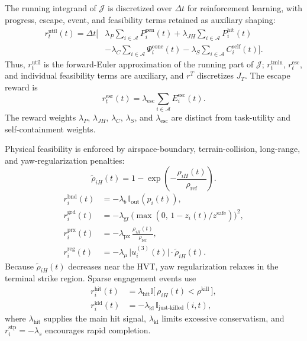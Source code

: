 \documentclass{cja}
\begin{document}
The running integrand of $\mathcal J$ is discretized over $\Delta t$ for reinforcement learning, with progress, escape, event, and feasibility terms retained as auxiliary shaping:
\begin{equation}
\begin{aligned}
r_t^{\mathrm{util}}(t)
=
\Delta t
\Biggl[
&
\lambda_P
\sum_{i\in\mathcal A}
P_i^{\mathrm{pen}}(t)
+
\lambda_{JH}
\sum_{i\in\mathcal A}
P_i^{\mathrm{hit}}(t)
\\
&-
\lambda_C
\sum_{i\in\mathcal A}
\Psi_i^{\mathrm{cone}}(t)
-
\lambda_S
\sum_{i\in\mathcal A}
C_i^{\mathrm{self}}(t)
\Biggr].
\end{aligned}
\label{eq:r-prior}
\end{equation}
Thus, $r_t^{\mathrm{util}}$ is the forward-Euler approximation of the running part of $\mathcal J$; $r_t^{\mathrm{tmin}}$, $r_t^{\mathrm{esc}}$, and individual feasibility terms are auxiliary, and $r^T$ discretizes $J_T$. The escape reward is
\begin{equation}
r_t^{\mathrm{esc}}(t)=\lambda_{\mathrm{esc}}\sum_{i\in\mathcal{A}}E_i^{\mathrm{esc}}(t).
\end{equation}
The reward weights $\lambda_P$, $\lambda_{JH}$, $\lambda_C$, $\lambda_S$, and $\lambda_{\mathrm{esc}}$ are distinct from task-utility and self-containment weights.

Physical feasibility is enforced by airspace-boundary, terrain-collision, long-range, and yaw-regularization penalties:
\begin{equation}
\widetilde\rho_{iH}(t)
=
1-
\exp\!\left(-\frac{\rho_{iH}(t)}{\rho_{\mathrm{ref}}}\right).
\end{equation}
\begin{align}
r_i^{\mathrm{bnd}}(t)&=-\lambda_b\,\mathbb{I}_{\mathrm{out}}(p_i(t)),
\label{eq:r-bnd}\\
r_i^{\mathrm{grd}}(t)&=-\lambda_{\mathrm{gr}}\,\bigl(\max(0,\,1-z_i(t)/z^{\mathrm{safe}})\bigr)^{2},
\label{eq:r-grd}\\
r_i^{\mathrm{prx}}(t)&=-\lambda_{\mathrm{px}}\,\frac{\rho_{iH}(t)}{\rho_{\mathrm{ref}}},
\label{eq:r-prx}\\
r_i^{\mathrm{reg}}(t)&=-\lambda_{\mu}\,\bigl|u_i^{(3)}(t)\bigr|\cdot \widetilde\rho_{iH}(t).
\label{eq:r-reg}
\end{align}
Because $\widetilde\rho_{iH}(t)$ decreases near the HVT, yaw regularization relaxes in the terminal strike region. Sparse engagement events use
\begin{equation}
\begin{aligned}
r_i^{\mathrm{hit}}(t)
&=\lambda_{\mathrm{hit}}\mathbb{I}\bigl[\,\rho_{iH}(t)<\rho^{\mathrm{kill}}\,\bigr],\\
r_i^{\mathrm{kld}}(t)
&=-\lambda_{\mathrm{kl}}\,\mathbb{I}_{\text{just-killed}}(i,t),
\end{aligned}
\label{eq:r-event}
\end{equation}
where $\lambda_{\mathrm{hit}}$ supplies the main hit signal, $\lambda_{\mathrm{kl}}$ limits excessive conservatism, and $r_i^{\mathrm{stp}}=-\lambda_s$ encourages rapid completion.
\end{document}
